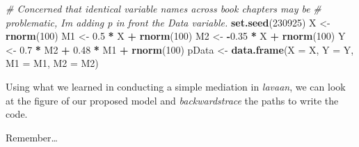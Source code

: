 \documentclass[
  11pt,
]{book}
\newenvironment{Shaded}{\begin{snugshade}}{\end{snugshade}}
\newcommand{\AttributeTok}[1]{\textcolor[rgb]{0.27,0.27,0.27}{#1}}
\newcommand{\CommentTok}[1]{\textcolor[rgb]{0.37,0.37,0.37}{\textit{#1}}}
\newcommand{\DecValTok}[1]{\textcolor[rgb]{0.06,0.06,0.06}{#1}}
\newcommand{\FloatTok}[1]{\textcolor[rgb]{0.06,0.06,0.06}{#1}}
\newcommand{\FunctionTok}[1]{\textcolor[rgb]{0.27,0.27,0.27}{\textbf{#1}}}
\newcommand{\NormalTok}[1]{#1}
\newcommand{\OtherTok}[1]{\textcolor[rgb]{0.37,0.37,0.37}{#1}}
\newcommand{\SpecialCharTok}[1]{\textcolor[rgb]{0.43,0.43,0.43}{\textbf{#1}}}
\begin{document}
\begin{Shaded}
\begin{Highlighting}[]
\CommentTok{\# Concerned that identical variable names across book chapters may be}
\CommentTok{\# problematic, I\textquotesingle{}m adding \textquotesingle{}p\textquotesingle{} in front the \textquotesingle{}Data\textquotesingle{} variable.}
\FunctionTok{set.seed}\NormalTok{(}\DecValTok{230925}\NormalTok{)}
\NormalTok{X }\OtherTok{\textless{}{-}} \FunctionTok{rnorm}\NormalTok{(}\DecValTok{100}\NormalTok{)}
\NormalTok{M1 }\OtherTok{\textless{}{-}} \FloatTok{0.5} \SpecialCharTok{*}\NormalTok{ X }\SpecialCharTok{+} \FunctionTok{rnorm}\NormalTok{(}\DecValTok{100}\NormalTok{)}
\NormalTok{M2 }\OtherTok{\textless{}{-}} \SpecialCharTok{{-}}\FloatTok{0.35} \SpecialCharTok{*}\NormalTok{ X }\SpecialCharTok{+} \FunctionTok{rnorm}\NormalTok{(}\DecValTok{100}\NormalTok{)}
\NormalTok{Y }\OtherTok{\textless{}{-}} \FloatTok{0.7} \SpecialCharTok{*}\NormalTok{ M2 }\SpecialCharTok{+} \FloatTok{0.48} \SpecialCharTok{*}\NormalTok{ M1 }\SpecialCharTok{+} \FunctionTok{rnorm}\NormalTok{(}\DecValTok{100}\NormalTok{)}
\NormalTok{pData }\OtherTok{\textless{}{-}} \FunctionTok{data.frame}\NormalTok{(}\AttributeTok{X =}\NormalTok{ X, }\AttributeTok{Y =}\NormalTok{ Y, }\AttributeTok{M1 =}\NormalTok{ M1, }\AttributeTok{M2 =}\NormalTok{ M2)}
\end{Highlighting}
\end{Shaded}

Using what we learned in conducting a simple mediation in \emph{lavaan}, we can look at the figure of our proposed model and \emph{backwardstrace} the paths to write the code.

Remember\ldots{}
\end{document}
